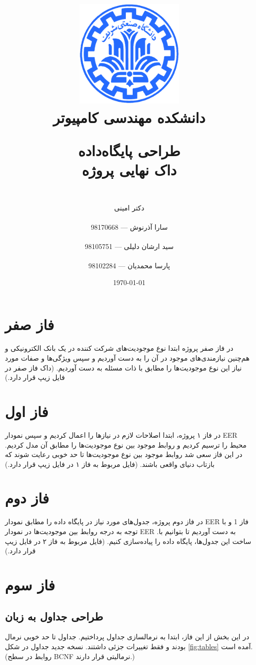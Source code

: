 \documentclass{article}
\title{
\includegraphics[width=0.4\textwidth]{sharif.png}\\
\normalsize{دانشکده مهندسی کامپیوتر}\\
\vspace{1cm}
	
\huge{طراحی پایگاه‌داده}
\\ \vspace{.8cm}
\Large{داک نهایی پروژه}
}
\author{
\\
دکتر امینی
\\ \vspace{.4cm}
\\
  سارا آذرنوش       ---      98170668
\\ \vspace{0.2cm} \\
  سید ارشان دلیلی       ---      98105751
\\ \vspace{0.2cm} \\
  پارسا محمدیان       ---      98102284
\\ \vspace{.4cm}
}
\date{\today}
\begin{document}
\clearpage
\maketitle
\thispagestyle{empty}

\newpage

\clearpage
\pagestyle{fancy}


\tableofcontents

\newpage

\setcounter{page}{1}


\section{فاز صفر}
 در فاز صفر پروژه ابتدا نوع موجودیت‌های شرکت کننده در یک بانک الکترونیکی و هم‌چنین نیازمندی‌های موجود در آن را به دست آوردیم و سپس ویژگی‌ها و صفات مورد نیاز این نوع موجودیت‌ها را مطابق با ذات مسئله به دست آوردیم.
(داک فاز صفر در فایل زیپ قرار دارد.)

\section{فاز اول}

در فاز ۱ پروژه، ابتدا اصلاحات لازم در نیازها را اعمال کردیم و سپس نمودار EER محیط را ترسیم کردیم و روابط موجود بین نوع موجودیت‌ها را مطابق آن مدل کردیم. در این فاز سعی شد روابط موجود بین نوع موجودیت‌ها تا حد خوبی رعایت شوند که بازتاب دنیای واقعی باشند.
(فایل مربوط به فاز ۱ در فایل زیپ قرار دارد.)
\section{فاز دوم}

در فاز دوم پروژه، جدول‌های مورد نیاز در پایگاه داده را مطابق نمودار EER فاز 1 و با توجه به درجه روابط بین موجودیت‌ها در نمودار EER .به دست آوردیم تا بتوانیم با ساخت این جدول‌ها، پایگاه داده را پیاده‌سازی کنیم.
(فایل مربوط به فاز ۲ در فایل زیپ قرار دارد.)


\section{فاز سوم}
\subsection{طراحی جداول به زبان }

در این بخش از این فاز، ابتدا به نرمالسازی جداول پرداختیم. جداول تا حد خوبی نرمال بودند و فقط تغییرات جزئی داشتند. 
نسخه جدید جداول در شکل 
\ref{fig:tables}
آمده است. 
(روابط در سطح BCNF نرمالیتی قرار دارند.)
\end{document}
